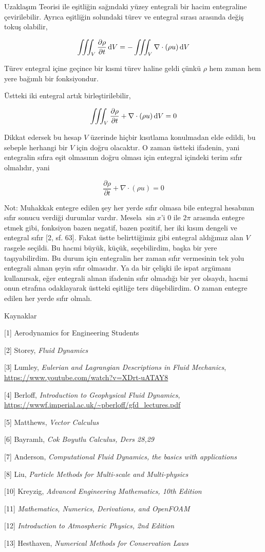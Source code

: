 \documentclass[12pt,fleqn]{article}\usepackage{../../common}
\begin{document}
Uzaklaşım Teorisi ile eşitliğin sağındaki yüzey entegrali bir hacim entegraline
çevirilebilir. Ayrıca eşitliğin solundaki türev ve entegral sırası arasında
değiş tokuş olabilir,

$$
\iiint_V \frac{\partial \rho}{\partial t} \,\mathrm{d} V = - \iiint_V \nabla \cdot (\rho u ) \,\mathrm{d} V
$$

Türev entegral içine geçince bir kısmi türev haline geldi çünkü $\rho$ hem zaman
hem yere bağımlı bir fonksiyondur.

Üstteki iki entegral artık birleştirilebilir,

$$
\iiint_V \frac{\partial \rho}{\partial t} + \nabla \cdot (\rho u ) \,\mathrm{d} V = 0
$$

Dikkat edersek bu hesap $V$ üzerinde hiçbir kısıtlama konulmadan elde edildi,
bu sebeple herhangi bir $V$ için doğru olacaktır. O zaman üstteki ifadenin,
yani entegralin sıfıra eşit olmasının doğru olması için entegral içindeki
terim sıfır olmalıdır, yani 

$$
\frac{\partial \rho}{\partial t} + \nabla \cdot (\rho u ) = 0
$$

Not: Muhakkak entegre edilen şey her yerde sıfır olmasa bile entegral hesabının
sıfır sonucu verdiği durumlar vardır. Mesela $\sin x$'i 0 ile $2\pi$ arasında
entegre etmek gibi, fonksiyon bazen negatif, bazen pozitif, her iki kısım
dengeli ve entegral sıfır [2, sf. 63]. Fakat üstte belirttiğimiz gibi entegral
aldığımız alan $V$ rasgele seçildi. Bu hacmi büyük, küçük, seçebilirdim, başka
bir yere taşıyabilirdim. Bu durum için entegralin her zaman sıfır vermesinin tek
yolu entegrali alınan şeyin sıfır olmasıdır. Ya da bir çelişki ile ispat
argümanı kullanırsak, eğer entegrali alınan ifadenin sıfır olmadığı bir yer
olsaydı, hacmi onun etrafına odaklayarak üstteki eşitliğe ters düşebilirdim. O
zaman entegre edilen her yerde sıfır olmalı.

Kaynaklar

[1] Aerodynamics for Engineering Students

[2] Storey, {\em Fluid Dynamics}

[3] Lumley, {\em Eulerian and Lagrangian Descriptions in Fluid Mechanics},
    \url{https://www.youtube.com/watch?v=XDrt-uATAY8}

[4] Berloff, {\em Introduction to Geophysical Fluid Dynamics},
    \url{https://wwwf.imperial.ac.uk/~pberloff/gfd_lectures.pdf}

[5] Matthews, {\em Vector Calculus}

[6] Bayramlı, {\em Cok Boyutlu Calculus, Ders 28,29}
    
[7] Anderson, {\em Computational Fluid Dynamics, the basics with applications}

[8] Liu, {\em Particle Methods for Multi-scale and Multi-physics}

[10] Kreyzig, {\em Advanced Engineering Mathematics, 10th Edition}

[11] {\em Mathematics, Numerics, Derivations, and OpenFOAM}

[12] {\em Introduction to Atmospheric Physics, 2nd Edition}

[13] Hesthaven, {\em Numerical Methods for Conservation Laws}
\end{document}
